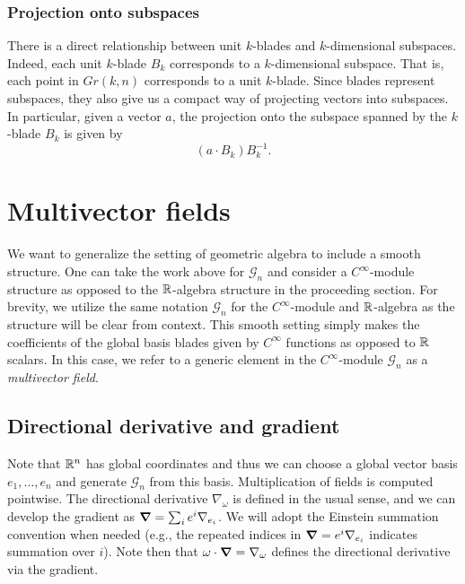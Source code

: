 \documentclass[12pt]{article}
\begin{document}
\subsubsection{Projection onto subspaces}

There is a direct relationship between unit $k$-blades and $k$-dimensional subspaces.  Indeed, each unit $k$-blade $B_k$ corresponds to a $k$-dimensional subspace.  That is, each point in $Gr(k,n)$ corresponds to a unit $k$-blade.  Since blades represent subspaces, they also give us a compact way of projecting vectors into subspaces.  In particular, given a vector $a$, the projection onto the subspace spanned by the $k$-blade $B_k$ is given by
\[
(a\cdot B_k)B_k^{-1}.
\]


\section{Multivector fields}

We want to generalize the setting of geometric algebra to include a smooth structure. One can take the work above for $\mathcal{G}_n$ and consider a $C^{\infty}$-module structure as opposed to the $\mathbb{R}$-algebra structure in the proceeding section. For brevity, we utilize the same notation $\mathcal{G}_n$ for the $C^\infty$-module and $\mathbb{R}$-algebra as the structure will be clear from context. This smooth setting simply makes the coefficients of the global basis blades given by $C^\infty$ functions as opposed to $\mathbb{R}$ scalars.  In this case, we refer to a generic element in the $C^{\infty}$-module $\mathcal{G}_n$ as a \emph{multivector field}.

\subsection{Directional derivative and gradient}

Note that $\mathbb{R}^n$ has global coordinates and thus we can choose a global vector basis $e_1,\dots,e_n$ and generate $\mathcal{G}_n$ from this basis.  Multiplication of fields is computed pointwise. The directional derivative $\nabla_\omega$ is defined in the usual sense, and we can develop the gradient as $\boldsymbol{\nabla} = \sum_{i} e^i \nabla_{e_i}$.  We will adopt the Einstein summation convention when needed (e.g., the repeated indices in $\boldsymbol{\nabla} = e^i \nabla_{e_i}$ indicates summation over $i$). Note then that $\omega \cdot \boldsymbol{\nabla} = \nabla_\omega$ defines the directional derivative via the gradient.  
\end{document}
